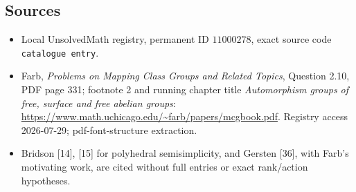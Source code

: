 \documentclass[11pt]{article}
\begin{document}
\subsection{Sources}
\begin{itemize}
\item Local UnsolvedMath registry, permanent ID \(11000278\), exact source code \texttt{catalogue entry}.
\item Farb, \emph{Problems on Mapping Class Groups and Related Topics}, Question 2.10, PDF page 331; footnote 2 and running chapter title \emph{Automorphism groups of free, surface and free abelian groups}: \url{https://www.math.uchicago.edu/~farb/papers/mcgbook.pdf}. Registry access 2026-07-29; pdf-font-structure extraction.
\item Bridson [14], [15] for polyhedral semisimplicity, and Gersten [36], with Farb's motivating work, are cited without full entries or exact rank/action hypotheses.
\end{itemize}
\end{document}
